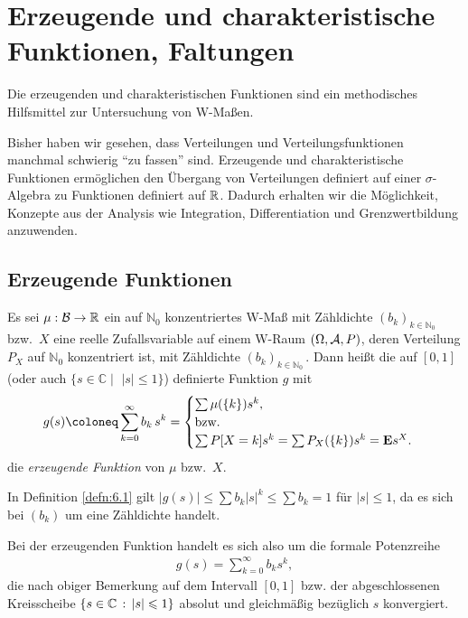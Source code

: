 \chapter{Erzeugende und charakteristische Funktionen, Faltungen}
\label{chap:6}

Die erzeugenden und charakteristischen Funktionen sind ein methodisches
Hilfsmittel zur Untersuchung von W-Maßen.

Bisher haben wir gesehen, dass Verteilungen und Verteilungsfunktionen 
manchmal schwierig ``zu fassen'' sind.
Erzeugende und charakteristische Funktionen ermöglichen den Übergang von
Verteilungen definiert auf einer $\sigma$-Algebra zu Funktionen definiert auf
$\mathbb{R}$. Dadurch erhalten wir die Möglichkeit, Konzepte aus der Analysis wie
Integration, Differentiation und Grenzwertbildung anzuwenden.

\section{Erzeugende Funktionen}

\begin{defn}
\label{defn:6.1}
Es sei $\mu :{\mathcal{B}} \to \mathbb{R}$ ein auf
$\mathbb{N}_{0}$ konzentriertes W-Maß mit Zähldichte $(b_{k})_{k\in
  \mathbb{N}_{0}}$ bzw.\ $X$ eine reelle Zufallsvariable auf einem W-Raum $(\Omega, {\cal
  A}, P)$, deren Verteilung $P_{X}$ auf $\mathbb{N}_{0}$ konzentriert ist, mit
Zähldichte $(b_{k})_{k\in \mathbb{N}_{0}}$\,. Dann heißt die auf $[0,1]$ (oder
auch $\{s\in \mathbb{C}\mid$ $| s | \leq 1 \}$) definierte Funktion $g$ mit
\begin{align*}
g(s) \defl\sum_{k=0}^ {\infty} b_{k} \, s^ {k} =
\begin{cases}
\sum \mu  (\{k\})s^ {k},\\
\text{bzw.}\\
\sum P[X=k]s^ {k}=\sum P_{X}(\{k\})s^ {k} =\E s ^ {X}.
\end{cases}
\end{align*}
die \emph{erzeugende Funktion} von $\mu $ bzw.~$X$.\fishhere
\end{defn}

\begin{bem}
\label{bem:6.1}
In Definition \ref{defn:6.1} gilt $| g (s)| \leq \sum b_{k}|
s | ^ {k}\leq \sum b_{k}=1$ für $| s | \leq 1$, da es sich bei $(b_k)$
um eine Zähldichte handelt.\maphere
\end{bem}

Bei der erzeugenden Funktion handelt es sich also um die formale Potenzreihe
\begin{align*}
g(s) = \sum\limits_{k=0}^\infty b_k s^k,
\end{align*}
die nach obiger Bemerkung auf dem Intervall $[0,1]$ bzw. der
abgeschlossenen Kreisscheibe $\left\{ s\in\mathbb{C}\,:\,\left|s\right|\leqslant 1\right\}$ absolut und
gleichmäßig bezüglich $s$ konvergiert.


